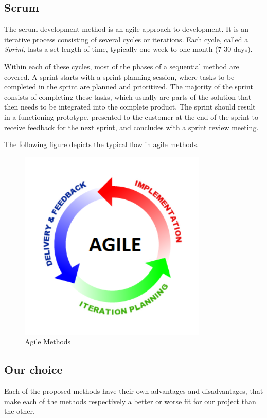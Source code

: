 \newpage
\subsection{Scrum}
The scrum development method is an agile approach to development. It is an iterative process consisting of several cycles or iterations. Each cycle, called a \emph{Sprint}, lasts a set length of time, typically one week to one month (7-30 days).

Within each of these cycles, most of the phases of a sequential method are covered. A sprint starts with a sprint planning session, where tasks to be completed in the sprint are planned and prioritized. The majority of the sprint consists of completing these tasks, which usually are parts of the solution that then needs to be integrated into the complete product. The sprint should result in a functioning prototype, presented to the customer at the end of the sprint to receive feedback for the next sprint, and concludes with a sprint review meeting.

The following figure depicts the typical flow in agile methods.

\begin{figure}[H]
\centering
\includegraphics[width=0.8\textwidth]{images/agile-methods.png}
\caption{Agile Methods \cite{agileModel}}
\label{fig:agile_model}
\end{figure}

\subsection{Our choice}\label{methodologyChoice}
Each of the proposed methods have their own advantages and disadvantages, that make each of the methods respectively a better or worse fit for our project than the other.

